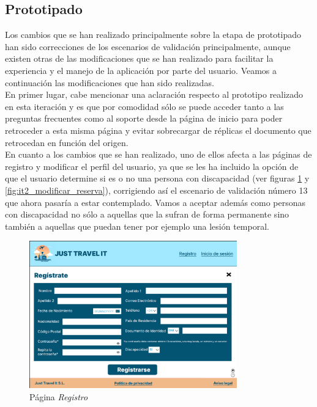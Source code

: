 \subsection{Prototipado}
Los cambios que se han realizado principalmente sobre la etapa de prototipado han sido correcciones de los escenarios de validación principalmente, aunque existen otras 
de las modificaciones que se han realizado para facilitar la experiencia y el manejo de la aplicación por parte del usuario. Veamos a continuación las modificaciones que 
han sido realizadas. \\

En primer lugar, cabe mencionar una aclaración respecto al prototipo realizado en esta iteración y es que por comodidad sólo se puede acceder tanto a las preguntas 
frecuentes como al soporte desde la página de inicio para poder retroceder a esta misma página y evitar sobrecargar de réplicas el documento que retrocedan en función 
del origen. \\

En cuanto a los cambios que se han realizado, uno de ellos afecta a las páginas de registro y modificar el perfil del usuario, ya que se les ha incluido la opción de que
el usuario determine si es o no una persona con discapacidad (ver figuras \ref{fig:it2_registro} y \ref{fig:it2_modificar_reserva}), corrigiendo así el escenario de validación número 13 que ahora pasaría a estar contemplado. Vamos a aceptar además
como personas con discapacidad no sólo a aquellas que la sufran de forma permanente sino también a aquellas que puedan tener por ejemplo una lesión temporal. \\
\begin{figure}[H]
    \centering
    \includegraphics[width = 0.8\textwidth]{Imagenes/hito_5/Iteracion2/Registro.png}
    \caption{Página \textit{Registro}}
    \label{fig:it2_registro}
\end{figure}

